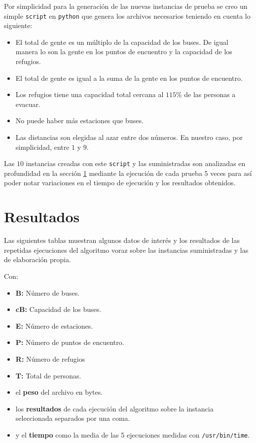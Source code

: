 \documentclass[letter, 10pt]{article}
\begin{document}
    Por simplicidad para la generación de las nuevas instancias de prueba se
    creo un simple \texttt{script} en \texttt{python} que genera los archivos
    necesarios teniendo en cuenta lo siguiente:
    \begin{itemize}
        \item
            El total de gente es un múltiplo de la capacidad de los buses. De
            igual manera lo son la gente en los puntos de encuentro y la 
            capacidad de los refugios.
        \item
            El total de gente es igual a la suma de la gente en los puntos de
            encuentro.
        \item
            Los refugios tiene una capacidad total cercana al $115\%$ de las
            personas a evacuar.
        \item
            No puede haber más estaciones que buses.
        \item
            Las distancias son elegidas al azar entre dos números. En 
            nuestro caso, por simplicidad, entre $1$ y $9$.
    \end{itemize}

    Las $10$ instancias creadas con este \texttt{script} y las suministradas son
    analizadas en profundidad en la sección \ref{sec:res} mediante 
    la ejecución de cada prueba 5 veces para así poder notar variaciones en el
    tiempo de ejecución y los resultados obtenidos.

\section{Resultados}\label{sec:res}

    Las siguientes tablas muestran algunos datos de interés y los resultados de
    las repetidas ejecuciones del algoritmo voraz sobre las instancias
    suministradas y las de elaboración propia.

    Con:
    \begin{itemize}
        \item \textbf{B:} Número de buses.
        \item \textbf{cB:} Capacidad de los buses.
        \item \textbf{E:} Número de estaciones.
        \item \textbf{P:} Número de puntos de encuentro.
        \item \textbf{R:} Número de refugios
        \item \textbf{T:} Total de personas.
        \item el \textbf{peso} del archivo en bytes.
        \item 
            los \textbf{resultados} de cada ejecución del algoritmo sobre la
            instancia seleccionada separados por una coma.
        \item y el \textbf{tiempo} como la media de las 5 ejecuciones medidas
            con \texttt{/usr/bin/time}.
    \end{itemize}
\end{document}
